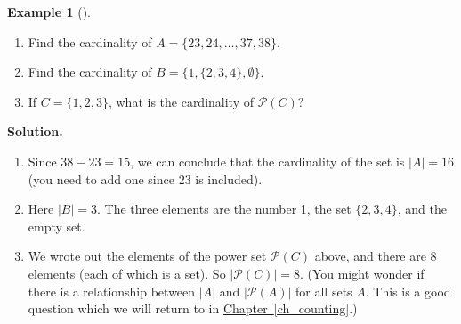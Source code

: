 \documentclass[10pt,]{book}
\theoremstyle{plain}
\theoremstyle{definition}
\theoremstyle{definition}
\newtheorem{example}[theorem]{Example}
\theoremstyle{definition}
\theoremstyle{definition}
\numberwithin{equation}{chapter}
\newcommand{\pow}{\mathcal P}
\newcommand{\card}[1]{\left| #1 \right|}
\begin{document}
\begin{example}[]\label{example-31}
\hypertarget{p-586}{}%
\leavevmode%
\begin{enumerate}
\item\hypertarget{li-257}{}\hypertarget{p-587}{}%
Find the cardinality of \(A = \{23, 24, \ldots, 37, 38\}\).%
\item\hypertarget{li-258}{}\hypertarget{p-588}{}%
Find the cardinality of \(B = \{1, \{2, 3, 4\}, \emptyset\}\).%
\item\hypertarget{li-259}{}\hypertarget{p-589}{}%
If \(C = \{1,2,3\}\), what is the cardinality of \(\pow(C)\)?%
\end{enumerate}
%
\par\smallskip%
\noindent\textbf{Solution.}\hypertarget{solution-66}{}\quad%
\hypertarget{p-590}{}%
\leavevmode%
\begin{enumerate}
\item\hypertarget{li-260}{}\hypertarget{p-591}{}%
Since \(38 - 23 = 15\), we can conclude that the cardinality of the set is \(|A| = 16\) (you need to add one since 23 is included).%
\item\hypertarget{li-261}{}\hypertarget{p-592}{}%
Here \(|B| = 3\). The three elements are the number 1, the set \(\{2,3,4\}\), and the empty set.%
\item\hypertarget{li-262}{}\hypertarget{p-593}{}%
We wrote out the elements of the power set \(\pow(C)\) above, and there are 8 elements (each of which is a set). So \(\card{\pow(C)} = 8\).  (You might wonder if there is a relationship between \(\card{A}\) and \(\card{\pow(A)}\) for all sets \(A\).  This is a good question which we will return to in \hyperref[ch_counting]{Chapter~\ref{ch_counting}}.)%
\end{enumerate}
%
\end{example}
\typeout{************************************************}
\typeout{************************************************}
\end{document}
